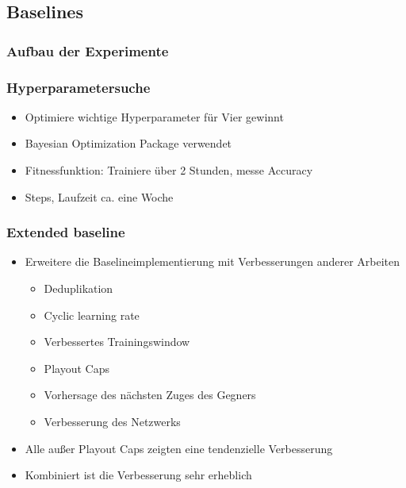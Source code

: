 \subsection{Baselines}



\begin{frame}
 \frametitle{Aufbau der Experimente}
  



  
\end{frame}
\begin{frame}
 \frametitle{Hyperparametersuche}
  


\begin{itemize}
  \item \pause Optimiere wichtige Hyperparameter für Vier gewinnt
  \item \pause Bayesian Optimization Package verwendet
  \item \pause Fitnessfunktion: Trainiere über 2 Stunden, messe Accuracy
  \item {} Steps, Laufzeit ca. eine Woche
\end{itemize}



  
\end{frame}
\begin{frame}
 \frametitle{Extended baseline}
  


\begin{itemize}
  \item \pause Erweitere die Baselineimplementierung mit Verbesserungen anderer Arbeiten
\begin{itemize}
  \item \pause Deduplikation
  \item \pause Cyclic learning rate
  \item \pause Verbessertes Trainingswindow
  \item \pause Playout Caps
  \item \pause Vorhersage des nächsten Zuges des Gegners
  \item \pause Verbesserung des Netzwerks
\end{itemize}
\end{itemize}

\begin{itemize}
  \item \pause Alle außer Playout Caps zeigten eine tendenzielle Verbesserung
  \item \pause Kombiniert ist die Verbesserung sehr erheblich
\end{itemize}

  
\end{frame}
